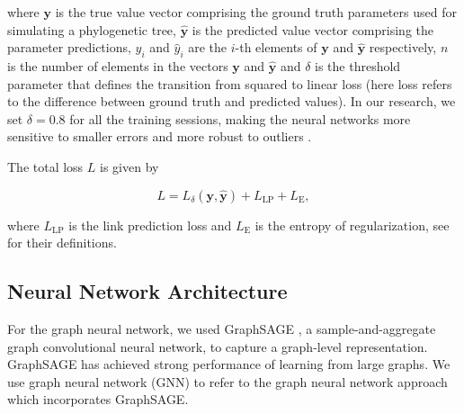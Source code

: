 {where \(\mathbf{y}\) is the true value vector comprising the ground truth parameters used for simulating a phylogenetic tree,
 \(\mathbf{\hat{y}}\) is the predicted value vector comprising the parameter predictions, \(y_i\) and \(\hat{y}_i\) are the \(i\)-th elements of \(\mathbf{y}\) and \(\mathbf{\hat{y}}\) respectively, \(n\) is the number of elements in the vectors \(\mathbf{y}\) and \(\mathbf{\hat{y}}\) and \(\delta\) is the threshold parameter that defines the transition from squared to linear loss (here loss refers to the difference between ground truth and predicted values). In our research, we set $\delta = 0.8$ for all the training sessions, making the neural networks more sensitive to smaller errors and more robust to outliers .

The total loss $L$ is given by

\begin{equation}
    \textit{L} =  L_{\delta}(\mathbf{y}, \mathbf{\hat{y}}) + \textit{L}_\text{LP} + \textit{L}_\text{E},
    \label{equation::total_loss}
\end{equation}

where $\textit{L}_\text{LP}$ is the link prediction loss and $\textit{L}_\text{E}$ is the entropy of regularization, see \citet{ying_hierarchical_2018} for their definitions.

\clearpage
\subsection{Neural Network Architecture}
\label{appendix::network_arch}
For the graph neural network, we used GraphSAGE \citep{hamilton_inductive_2017}, a sample-and-aggregate graph convolutional neural network, to capture a graph-level representation. GraphSAGE has achieved strong performance of learning from large graphs. We use graph neural network (GNN) to refer to the graph neural network approach which incorporates GraphSAGE. 

}
